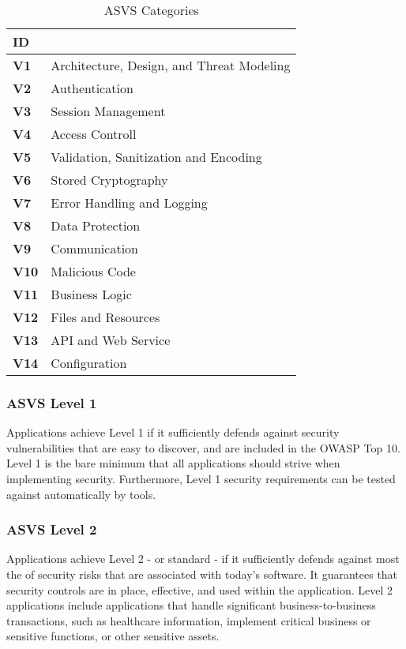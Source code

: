\begin{table}[!b]
    \centering
    \caption{ASVS Categories}
    \label{tab:asvs-categories}
    \begin{tabulary}{1.0\textwidth}{|l|L|}
        \hline
        \textbf{ID} &  \\                                                    
        \hline
        \textbf{V1} & Architecture, Design, and Threat Modeling \\
        \hline
        \textbf{V2} & Authentication \\
        \hline
        \textbf{V3} & Session Management \\
        \hline
        \textbf{V4} & Access Controll \\
        \hline
        \textbf{V5} & Validation, Sanitization and Encoding \\
        \hline
        \textbf{V6} & Stored Cryptography \\
        \hline
        \textbf{V7} & Error Handling and Logging \\
        \hline
        \textbf{V8} & Data Protection \\
        \hline
        \textbf{V9} & Communication \\
        \hline
        \textbf{V10} & Malicious Code \\
        \hline
        \textbf{V11} & Business Logic \\
        \hline
        \textbf{V12} & Files and Resources \\
        \hline
        \textbf{V13} & API and Web Service \\
        \hline
        \textbf{V14} & Configuration \\
        \hline
    \end{tabulary}
\end{table}


\subsubsection{ASVS Level 1}
Applications achieve Level 1 if it sufficiently defends against security vulnerabilities that are easy to discover, and are included in the OWASP Top 10. Level 1 is the bare minimum that all applications should strive when implementing security. Furthermore, Level 1 security requirements can be tested against automatically by tools.

\subsubsection{ASVS Level 2}
Applications achieve Level 2 - or standard - if it sufficiently defends against most the of security risks that are associated with today's software. It guarantees that security controls are in place, effective, and used within the application. Level 2 applications include applications that handle significant business-to-business transactions, such as healthcare information, implement critical business or sensitive functions, or other sensitive assets.

